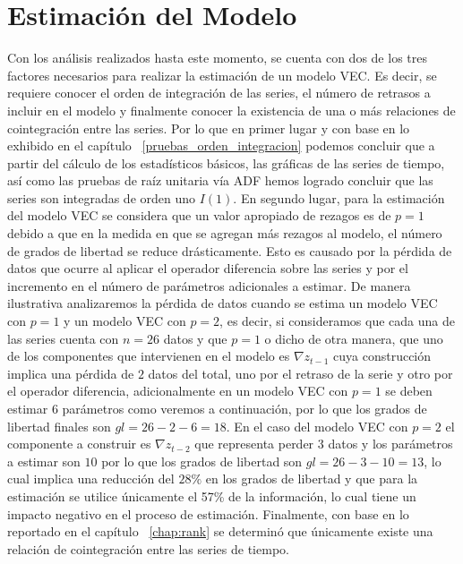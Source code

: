 

\section{Estimación del Modelo}


Con los análisis realizados hasta este momento, se cuenta con dos de los tres factores necesarios para realizar la estimación de un modelo VEC. Es decir, se requiere conocer el orden de integración de las series, el número de retrasos a incluir en el modelo y finalmente conocer la existencia de una o más relaciones de cointegración entre las series. Por lo que en primer lugar y con base en lo exhibido en el capítulo ~\ref{pruebas_orden_integracion}  podemos concluir que a partir del cálculo de los estadísticos básicos, las gráficas de las series de tiempo, así como las pruebas de raíz unitaria vía ADF hemos logrado concluir que las series son integradas de orden uno $I(1)$.  En segundo lugar, para la estimación del modelo VEC se considera que un valor apropiado de rezagos es de $p=1$ debido a que en la medida en que se agregan más rezagos al modelo, el número de grados de libertad se reduce drásticamente. Esto es causado por la pérdida de datos que ocurre al aplicar el operador diferencia sobre las series y por el incremento en el número de parámetros adicionales a estimar.  De manera ilustrativa analizaremos la pérdida de datos cuando se estima un modelo VEC con $p=1$ y un modelo VEC con $p=2$, es decir,  si consideramos que cada una de las series cuenta con $n=26$ datos y que $p=1$ o dicho de otra manera, que uno de los componentes que intervienen en el modelo es $\nabla z_{t-1}$ cuya construcción implica una pérdida de $2$ datos del total, uno por el retraso de la serie y otro por el operador diferencia, adicionalmente en un modelo VEC con $p=1$ se deben estimar $6$ parámetros como veremos a continuación, por lo que los grados de libertad finales son $gl=26-2-6=18$. En el caso del modelo VEC con $p=2$ el componente a construir es $\nabla z_{t-2}$ que representa perder $3$ datos y los parámetros a estimar son $10$ por lo que los grados de libertad son $gl=26-3-10=13$, lo cual implica una reducción del $28\%$ en los grados de libertad y que para la estimación se utilice únicamente el 57\% de la información, lo cual tiene un impacto negativo en el proceso de estimación. Finalmente, con base en lo reportado en el capítulo ~\ref{chap:rank} se determinó que únicamente existe una relación de cointegración entre las series de tiempo. 

